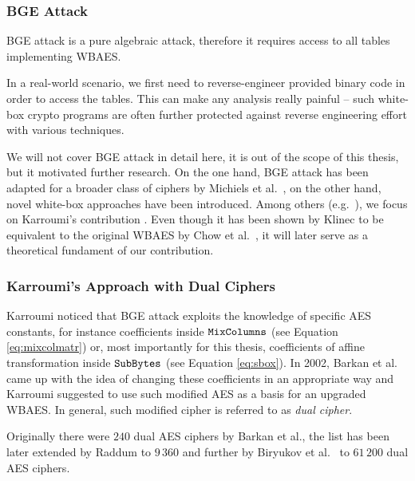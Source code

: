 \subsubsection{BGE Attack}
	
	BGE attack is a pure algebraic attack, therefore it requires access to all tables implementing WBAES.
	
	\begin{note}
	\label{note:reverse}
		In a real-world scenario, we first need to reverse-engineer provided binary code in order to access the tables. This can make any analysis really painful -- such white-box crypto programs are often further protected against reverse engineering effort with various techniques.
	\end{note}
	
	We will not cover BGE attack in detail here, it is out of the scope of this thesis, but it motivated further research. On the one hand, BGE attack has been adapted for a broader class of ciphers by Michiels et al.\ \cite{michiels2008cryptanalysis}, on the other hand, novel white-box approaches have been introduced. Among others (e.g.\ \cite{michiels2007cryptographic, xiao2009secure}), we focus on Karroumi's contribution \cite{karroumi2011protecting}. Even though it has been shown by Klinec \cite{klinec2013white} to be equivalent to the original WBAES by Chow et al.\ \cite{chow2003aes}, it will later serve as a theoretical fundament of our contribution.

\subsubsection{Karroumi's Approach with Dual Ciphers}
	
	Karroumi noticed that BGE attack exploits the knowledge of specific AES constants, for instance coefficients inside $\texttt{MixColumns}$ (see Equation \ref{eq:mixcolmatr}) or, most importantly for this thesis, coefficients of affine transformation inside $\texttt{SubBytes}$ (see Equation \ref{eq:sbox}). In 2002, Barkan et al.\ \cite{barkan2002many} came up with the idea of changing these coefficients in an appropriate way and Karroumi suggested to use such modified AES as a basis for an upgraded WBAES. In general, such modified cipher is referred to as {\em dual cipher}.
	
	Originally there were $240$ dual AES ciphers by Barkan et al., the list has been later extended by Raddum \cite{raddum2004more} to $9\,360$ and further by Biryukov et al.\ \cite{biryukov2003toolbox} to $61\,200$ dual AES ciphers.
	
